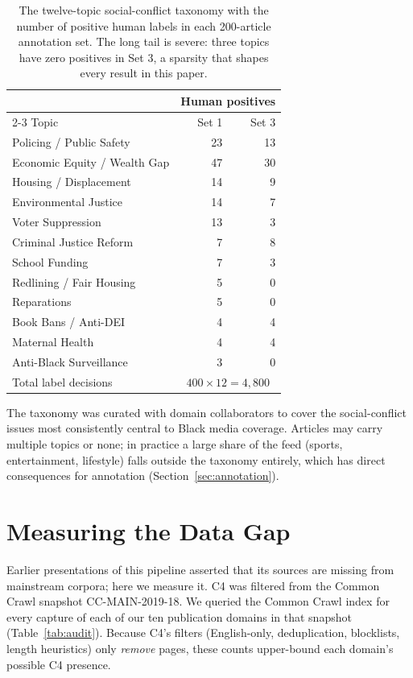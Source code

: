 \documentclass[letterpaper,twocolumn,10pt]{article}
\begin{document}
\begin{table}[t]
\centering
\small
\begin{tabular}{lrr}
\toprule
& \multicolumn{2}{c}{Human positives} \\
\cmidrule(lr){2-3}
Topic & Set 1 & Set 3 \\
\midrule
Policing / Public Safety        & 23 & 13 \\
Economic Equity / Wealth Gap    & 47 & 30 \\
Housing / Displacement          & 14 &  9 \\
Environmental Justice           & 14 &  7 \\
Voter Suppression               & 13 &  3 \\
Criminal Justice Reform         &  7 &  8 \\
School Funding                  &  7 &  3 \\
Redlining / Fair Housing        &  5 &  0 \\
Reparations                     &  5 &  0 \\
Book Bans / Anti-DEI            &  4 &  4 \\
Maternal Health                 &  4 &  4 \\
Anti-Black Surveillance         &  3 &  0 \\
\midrule
Total label decisions           & \multicolumn{2}{c}{$400 \times 12 = 4{,}800$} \\
\bottomrule
\end{tabular}
\caption{The twelve-topic social-conflict taxonomy with the number of
positive human labels in each 200-article annotation set. The long tail
is severe: three topics have zero positives in Set 3, a sparsity that
shapes every result in this paper.}
\label{tab:taxonomy}
\end{table}

The taxonomy was curated with domain collaborators to cover the
social-conflict issues most consistently central to Black media coverage.
Articles may carry multiple topics or none; in practice a large share of
the feed (sports, entertainment, lifestyle) falls outside the taxonomy
entirely, which has direct consequences for annotation
(Section~\ref{sec:annotation}).

\section{Measuring the Data Gap}
\label{sec:gap}

Earlier presentations of this pipeline asserted that its sources are
missing from mainstream corpora; here we measure it. C4
\cite{raffel2020} was filtered from the Common Crawl snapshot
CC-MAIN-2019-18. We queried the Common Crawl index for every capture of
each of our ten publication domains in that snapshot
(Table~\ref{tab:audit}). Because C4's filters (English-only,
deduplication, blocklists, length heuristics) only \emph{remove} pages,
these counts upper-bound each domain's possible C4 presence.
\end{document}

